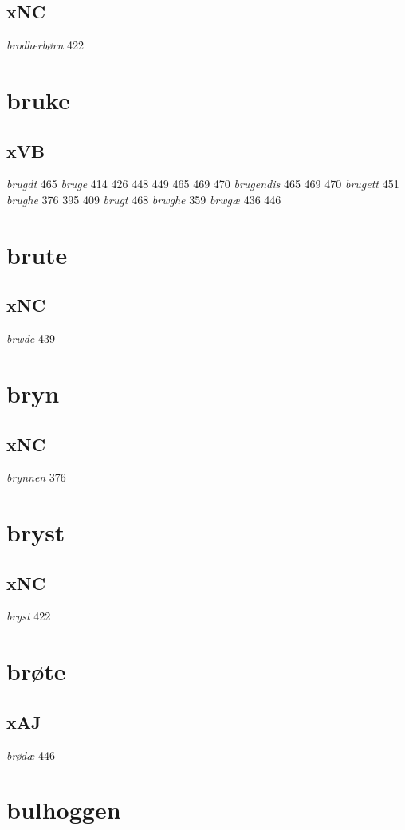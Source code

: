 \documentclass[a4paper,twocolumn]{article}
\begin{document}
\subsection{xNC}
\label{sec:orgedddaf3}
\emph{brodherbørn} 422 
\section{bruke}
\label{sec:org2d02e49}
\subsection{xVB}
\label{sec:org0865a2c}
\emph{brugdt} 465 \emph{bruge} 414 426 448 449 465 469 470 \emph{brugendis} 465 469 470 \emph{brugett} 451 \emph{brughe} 376 395 409 \emph{brugt} 468 \emph{brwghe} 359 \emph{brwgæ} 436 446 
\section{brute}
\label{sec:org2d60b22}
\subsection{xNC}
\label{sec:org5a56b10}
\emph{brwde} 439 
\section{bryn}
\label{sec:org2b521b3}
\subsection{xNC}
\label{sec:orge8dedc3}
\emph{brynnen} 376 
\section{bryst}
\label{sec:orgfa0d0d2}
\subsection{xNC}
\label{sec:orge68b55e}
\emph{bryst} 422 
\section{brøte}
\label{sec:org4d4c32b}
\subsection{xAJ}
\label{sec:org57bcf08}
\emph{brødæ} 446 
\section{bulhoggen}
\label{sec:org136f3ce}
\end{document}
